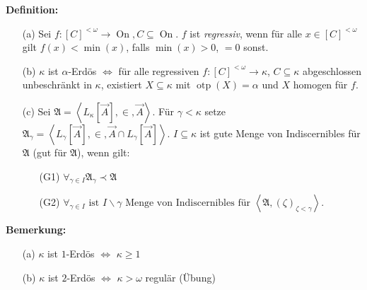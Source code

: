 \documentclass[a4paper,fontsize=11pt]{scrartcl}
\newcommand{\On}{\operatorname{On}}
\newcommand{\otp}{\operatorname{otp}}
\begin{document}
{\bf Definition:} 
\begin{itemize}
  \item[(a)] Sei $f:[C]^{<\omega}\rightarrow\On,C\subseteq\On$. $f$
    ist {\it regressiv}, wenn für alle $x\in[C]^{<\omega}$ gilt
    $f(x)<\min(x)$, falls $\min(x)>0$, $=0$ sonst.
  \item[(b)] $\kappa$ ist $\alpha$-Erdös $\Leftrightarrow$ für alle
    regressiven $f:[C]^{<\omega}\rightarrow\kappa$, $C\subseteq\kappa$
    abgeschlossen unbeschränkt in $\kappa$, existiert
    $X\subseteq\kappa$ mit $\otp(X)=\alpha$ und $X$ homogen für $f$.
  \item[(c)] Sei
    $\mathfrak{A}=\left<L_\kappa[\vec{A}],\in,\vec{A}\right>$. Für
    $\gamma<\kappa$ setze
    $\mathfrak{A}_\gamma=\left<L_\gamma[\vec{A}],\in,\vec{A}\cap
    L_\gamma[\vec{A}]\right>$. $I\subseteq\kappa $ ist gute Menge von
    Indiscernibles für $\mathfrak{A}$ (gut für $\mathfrak{A}$), wenn
    gilt:
    \begin{itemize}
      \item[(G1)] $\forall_{\gamma\in I}\mathfrak{A}_\gamma\prec\mathfrak{A}$
      \item[(G2)] $\forall_{\gamma\in I}\mbox{ ist
      }I\backslash\gamma\mbox{ Menge von Indiscernibles für
      }\left<\mathfrak{A},(\zeta)_{\zeta<\gamma}\right>$.
    \end{itemize}
\end{itemize}

{\bf Bemerkung:}
\begin{itemize}
\item[(a)] $\kappa$ ist $1$-Erdös $\Leftrightarrow$ $\kappa\ge 1$
\item[(b)] $\kappa$ ist $2$-Erdös $\Leftrightarrow$ $\kappa>\omega$ regulär (Übung)
\end{itemize}
\end{document}
